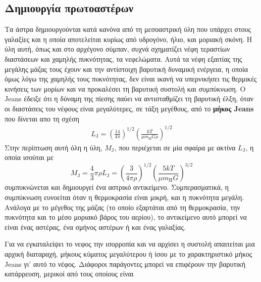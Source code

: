\subsection{Δημιουργία πρωτοαστέρων}
Τα άστρα δημιουργούνται κατά κανόνα από τη μεσοαστρική ύλη που υπάρχει στους γαλαξίες και η οποία αποτελείται κυρίως από υδρογόνο, ήλιο, και μοριακή σκόνη. Η ύλη αυτή, όπως και στο αρχέγονο σύμπαν, συχνά σχηματίζει νέφη τεραστίων διαστάσεων και χαμηλής πυκνότητας, τα νεφελώματα. Αυτά τα νέφη εξαιτίας της μεγάλης μάζας τους έχουν και την αντίστοιχη βαρυτική δυναμική ενέργεια, η οποία όμως λόγω της χαμηλής τους πυκνότητας, δεν είναι ικανή να υπερνικήσει τις θερμικές κινήσεις των μορίων και να προκαλέσει τη βαρυτική συστολή και συμπύκνωση.
Ο Jeans έδειξε ότι η δύναμη της πίεσης παύει να αντισταθμίζει τη βαρυτική έλξη, όταν οι διαστάσεις του νέφους είναι μεγαλύτερες, σε τάξη μεγέθους, από το \textbf{μήκος Jeans} που δίνεται απο τη σχέση
\begin{eqnarray}
    \label{eq:jeans_length}
    L_{\text{J}} = \left(\frac{14}{4\pi} \right)^{1/2} \left(\frac{kT}{\mu m_{\text{H}} G \rho} \right)^{1/2}
\end{eqnarray}
Στην περίπτωση αυτή όλη η ύλη, $M_{\text{J}}$, που περιέχεται σε μία σφαίρα με ακτίνα $L_{\text{J}}$, η οποία ισούται με
\begin{equation}
    \label{eq:jeans_mass}
    M_{\text{J}} = \frac{4}{3} \pi \rho L_{\text{J}} = \left(\frac{3}{4\pi \rho} \right)^{1/2} \left( \frac{5kT}{\mu m_{\text{H}} G} \right)^{3/2}
\end{equation}
συμπυκνώνεται και δημιουργεί ένα αστρικό αντικείμενο. Συμπερασματικά, η συμπύκνωση ευνοείται όταν η θερμοκρασία είναι μικρή, και η πυκνότητα μεγάλη. Ανάλογα με το μέγεθος της μάζας (το οποίο εξαρτάται από τη θερμοκρασία, την πυκνότητα και το μέσο μοριακό βάρος του αερίου), το αντικείμενο αυτό μπορεί να είναι ένας αστέρας, ένα σμήνος αστέρων ή και ένας γαλαξίας.

Για να εγκαταλείψει το νεφος την ισορροπία και να αρχίσει η συστολή απαιτείται μια αρχική διαταραχή, μήκους κύματος μεγαλύτερου ή ίσου με το χαρακτηριστικό μήκος Jeans γι' αυτό το νέφος. Διάφοροι παράγοντες μπορεί να επιφέρουν την βαρυτική κατάρρευση, μερικοί από τους οποίους είναι
  
